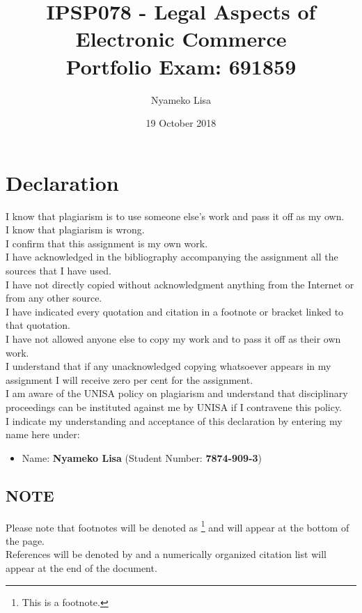 \documentclass[11pt]{article}
\author{Nyameko Lisa}
\date{19 October 2018}
\title{IPSP078 - Legal Aspects of Electronic Commerce\\\medskip
\large Portfolio Exam: 691859}
\begin{document}
\maketitle
\addvspace{110pt}

\justifying
\addvspace{110pt}
\section*{Declaration}
\label{sec:orgb4520eb}
I know that plagiarism is to use someone else’s work and pass it off as my own.\\
I know that plagiarism is wrong.\\
I confirm that this assignment is my own work.\\
I have acknowledged in the bibliography accompanying the assignment all the sources that I have used.\\
I have not directly copied without acknowledgment anything from the Internet or from any other source.\\
I have indicated every quotation and citation in a footnote or bracket linked to that quotation.\\
I have not allowed anyone else to copy my work and to pass it off as their own work.\\
I understand that if any unacknowledged copying whatsoever appears in my assignment I will receive zero per cent for the assignment.\\
I am aware of the UNISA policy on plagiarism and understand that disciplinary proceedings can be instituted against me by UNISA if I contravene this policy.\\
I indicate my understanding and acceptance of this declaration by
entering my name here under:
\begin{itemize}
\item Name: \textbf{Nyameko Lisa} (Student Number: \textbf{7874-909-3})
\end{itemize}

\subsection*{NOTE}
\label{sec:orgcc148e9}
Please note that footnotes will be denoted as \footnote{This is a footnote.} and will
appear at the bottom of the page.\\
References will be denoted by \cite{rsa02_elect_comm_trans_act} and a numerically
organized citation list will appear at the end of the document.
\newpage
\end{document}
